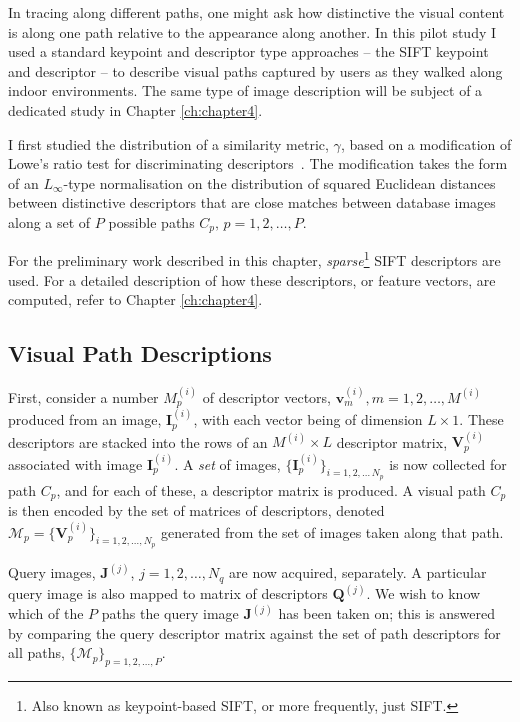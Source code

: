 In tracing along different paths, one might ask how distinctive the visual content is along one path relative to the appearance along another. In this pilot study I used a standard keypoint and descriptor type approaches -- the SIFT keypoint and descriptor -- to describe visual paths captured by users as they walked along indoor environments. The same type of image description will be subject of a dedicated study in Chapter \ref{ch:chapter4}.

I first studied the distribution of a similarity metric, $\gamma$, based on a modification of Lowe's ratio test for discriminating descriptors~\cite{Lowe2004}. The modification takes the form of an $L_{\infty}$-type normalisation on the distribution of squared Euclidean distances between distinctive descriptors that are close matches between database images along a set of $P$ possible paths $C_p,\,p=1,2,\ldots, P$.

For the preliminary work described in this chapter, \textit{sparse}\footnote{Also known as keypoint-based SIFT, or more frequently, just SIFT.} SIFT descriptors are used. For a detailed description of how these descriptors, or feature vectors, are computed, refer to Chapter \ref{ch:chapter4}.


\subsection{Visual Path Descriptions} First, consider a number $M_p^{(i)}$ of descriptor vectors, $\mathbf{v}_m^{(i)}, m=1,2,\ldots,M^{(i)}$ produced from an image, $\mathbf{I}^{(i)}_p$, with each vector being of  dimension $L \times 1$.  These descriptors are stacked into the rows of an $M^{(i)}\times L$ descriptor matrix, $\mathbf{V}^{(i)}_p$ associated with image $\mathbf{I}^{(i)}_p$.  A \textit{set} of images, $\lbrace \mathbf{I}^{(i)}_p\rbrace_{i=1,2,\ldots\,N_p}$ is now collected for path $C_p$, and for each of these, a descriptor matrix is produced.  A visual path $C_p$ is then encoded by the set of matrices of descriptors, denoted $\mathcal{M}_p=\lbrace \mathbf{V}^{(i)}_p \rbrace_{i=1,2,\ldots,N_p}$ generated from the set of images taken along that path.
 
Query images, $\mathbf{J}^{(j)}$, $j=1,2,\ldots,N_q$ are now acquired, separately.  A particular query image is also mapped to matrix of descriptors $\mathbf{Q}^{(j)}$. We wish to know which of the $P$ paths the query image $\mathbf{J}^{(j)}$ has been taken on; this is answered by comparing the query descriptor matrix against the set of path descriptors for all paths, $\lbrace \mathcal{M}_p \rbrace_{p=1,2,\ldots, P}$.

